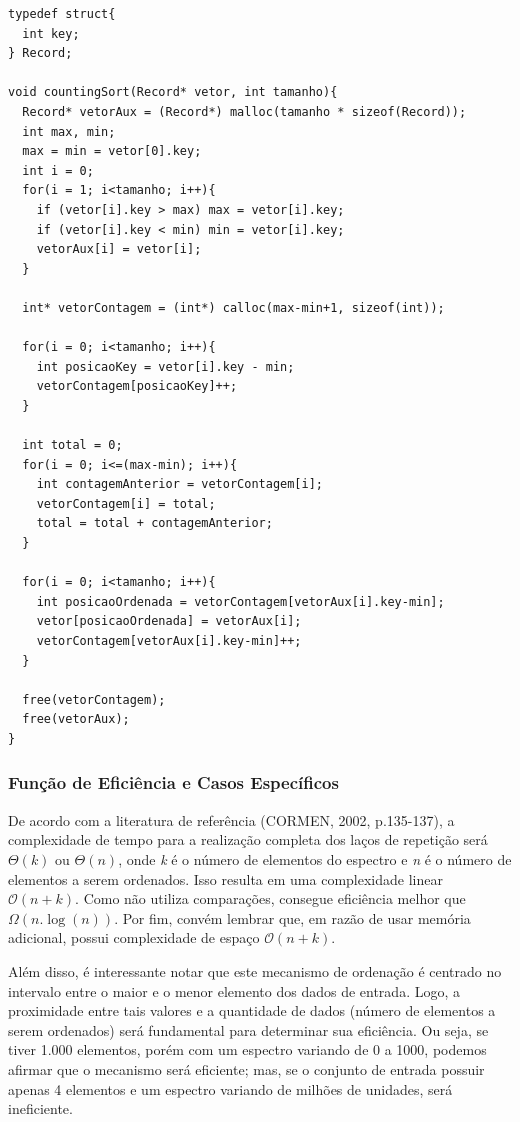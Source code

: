 \documentclass[a4paper, 12pt]{article}
\begin{document}
\begin{verbatim}
typedef struct{
  int key;
} Record;

void countingSort(Record* vetor, int tamanho){
  Record* vetorAux = (Record*) malloc(tamanho * sizeof(Record));
  int max, min;
  max = min = vetor[0].key;
  int i = 0;
  for(i = 1; i<tamanho; i++){
    if (vetor[i].key > max) max = vetor[i].key;
    if (vetor[i].key < min) min = vetor[i].key;
    vetorAux[i] = vetor[i];
  }

  int* vetorContagem = (int*) calloc(max-min+1, sizeof(int));
	
  for(i = 0; i<tamanho; i++){
    int posicaoKey = vetor[i].key - min;
    vetorContagem[posicaoKey]++;
  }
	
  int total = 0;
  for(i = 0; i<=(max-min); i++){
    int contagemAnterior = vetorContagem[i];
    vetorContagem[i] = total;
    total = total + contagemAnterior;
  }
	
  for(i = 0; i<tamanho; i++){
    int posicaoOrdenada = vetorContagem[vetorAux[i].key-min];
    vetor[posicaoOrdenada] = vetorAux[i];
    vetorContagem[vetorAux[i].key-min]++;
  }
	
  free(vetorContagem);
  free(vetorAux);
}
\end{verbatim}

\subsubsection{Função de Eficiência e Casos Específicos}
\tab{ } De acordo com a literatura de referência (CORMEN, 2002, p.135-137), a complexidade de tempo para a realização completa dos laços de repetição será $\Theta(k)$ ou $\Theta(n)$, onde \textit{k} é o número de elementos do espectro e \textit{n} é o número de elementos a serem ordenados. Isso resulta em uma complexidade linear $\mathcal{O}(n+k)$. Como não utiliza comparações, consegue eficiência melhor que $\Omega (n.\log(n))$. Por fim, convém lembrar que, em razão de usar memória adicional, possui complexidade de espaço $\mathcal{O}(n+k)$.

Além disso, é interessante notar que este mecanismo de ordenação é centrado no intervalo entre o maior e o menor elemento dos dados de entrada. Logo, a proximidade entre tais valores e a quantidade de dados (número de elementos a serem ordenados) será fundamental para determinar sua eficiência. Ou seja, se tiver 1.000 elementos, porém com um espectro variando de 0 a 1000, podemos afirmar que o mecanismo será eficiente; mas, se o conjunto de entrada possuir apenas 4 elementos e um espectro variando de milhões de unidades, será ineficiente. 
\end{document}
